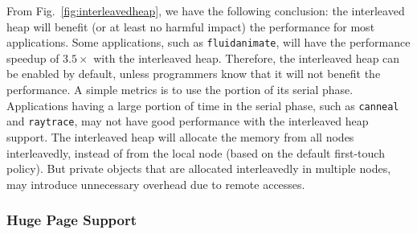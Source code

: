 From Fig.~\ref{fig:interleavedheap}, we have the following conclusion: the interleaved heap will benefit (or at least no harmful impact) the performance for most applications. Some applications, such as \texttt{fluidanimate}, will have the performance speedup of $3.5\times$ with the interleaved heap. Therefore, the interleaved heap can be enabled by default, unless programmers know that it will not benefit the performance. A simple metrics is to use the portion of its serial phase. Applications having a large portion of time in the serial phase, such as \texttt{canneal} and \texttt{raytrace}, may not have good performance with the interleaved heap support. The interleaved heap will allocate the memory from all nodes interleavedly, instead of from the local node (based on the default first-touch policy). But private objects that are allocated interleavedly in multiple nodes, may introduce unnecessary overhead due to remote accesses. 








\subsubsection{Huge Page Support} 
\label{sec:hugepage}

